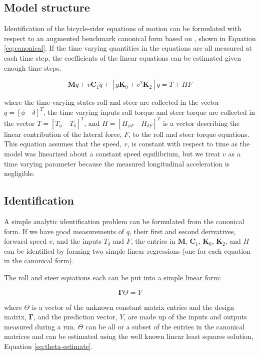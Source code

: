 \documentclass[a4paper]{article}
\begin{document}
\subsection{Model structure}

Identification of the bicycle-rider equations of motion can be formulated with
respect to an augmented benchmark canonical form based on \cite{Meijaard2007},
shown in Equation \ref{eq:canonical}. If the time varying quantities in the
equations are all measured at each time step, the coefficients of the linear
equations can be estimated given enough time steps.

\begin{equation}
  \mathbf{M} \ddot{q} + v \mathbf{C}_1 \dot{q} + [g \mathbf{K}_0 + v^2
  \mathbf{K}_2] q = T + H F
  \label{eq:canonical}
\end{equation}

where the time-varying states roll and steer are collected in the vector $q =
[\phi \quad \delta]^T$, the time varying inputs roll torque and steer torque
are collected in the vector $T = [T_\phi \quad T_\delta]^T$, and $H = [H_{\phi
F} \quad H_{\delta F}]^T$ is a vector describing the linear contribution of the
lateral force, $F$, to the roll and steer torque equations. This equation
assumes that the speed, $v$, is constant with respect to time as the model was
linearized about a constant speed equilibrium, but we treat $v$ as a time
varying parameter because the measured longitudinal acceleration is negligible.

\subsection{Identification}

A simple analytic identification problem can be formulated from the canonical
form. If we have good measurements of $q$, their first and second derivatives,
forward speed $v$, and the inputs $T_\delta$ and $F$, the entries in
$\mathbf{M}$, $\mathbf{C}_1$, $\mathbf{K}_0$, $\mathbf{K}_2$, and $H$ can be
identified by forming two simple linear regressions (one for each equation
in the canonical form).

The roll and steer equations each can be put into a simple linear form:

\begin{equation}
  \mathbf{\Gamma} \Theta = Y
\end{equation}

where $\Theta$ is a vector of the unknown constant matrix entries and the
design matrix, $\mathbf{\Gamma}$, and the prediction vector, $Y$, are made up
of the inputs and outputs measured during a run. $\Theta$ can be all or a
subset of the entries in the canonical matrices and can be estimated using the
well known linear least squares solution, Equation \ref{eq:theta-estimate}.
\end{document}
